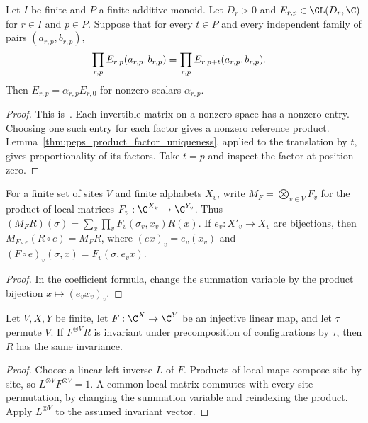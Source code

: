\begin{lemma}%
    \label{thm:peps_directional_product_factors}
    \leanok
    Let $I$ be finite and $P$ a finite additive monoid. Let
    $D_r>0$ and $E_{r,p}\in\GL(D_r,\C)$ for $r\in I$ and $p\in P$.
    Suppose that for every $t\in P$ and every independent family of pairs
    $(a_{r,p},b_{r,p})$,
    \begin{align}
        \prod_{r,p} E_{r,p}(a_{r,p},b_{r,p})
         & =\prod_{r,p} E_{r,p+t}(a_{r,p},b_{r,p}).\notag
    \end{align}
    Then $E_{r,p}=\alpha_{r,p}E_{r,0}$ for nonzero scalars $\alpha_{r,p}$.
\end{lemma}
\begin{proof}\leanok
    This is~\cite[``Proportionality of directional matrix
        factors'']{QICLean2026Blueprint}.
    Each invertible matrix on a nonzero space has a nonzero entry.
    Choosing one such entry for each factor gives a nonzero reference product.
    Lemma~\ref{thm:peps_product_factor_uniqueness}, applied to the
    translation by $t$, gives proportionality of its factors. Take $t=p$
    and inspect the factor at position zero.
\end{proof}

\begin{lemma}%
    \label{thm:peps_physical_product_reindex}
    \leanok
    For a finite set of sites $V$ and finite alphabets $X_v$, write
    $M_F=\bigotimes_{v\in V}F_v$ for the product of local matrices
    $F_v:\C^{X_v}\to\C^{Y_v}$. Thus
    $(M_F R)(\sigma)=\sum_x\prod_vF_v(\sigma_v,x_v)R(x)$.
    If $e_v:X'_v\to X_v$ are bijections, then
    $M_{F\circ e}(R\circ e)=M_F R$, where
    $(e x)_v=e_v(x_v)$ and $(F\circ e)_v(\sigma,x)=F_v(\sigma,e_vx)$.
\end{lemma}
\begin{proof}\leanok
    In the coefficient formula, change the summation variable by the
    product bijection $x\mapsto(e_vx_v)_v$.
\end{proof}

\begin{lemma}%
    \label{thm:peps_common_map_reflects_invariance}
    \leanok
    Let $V,X,Y$ be finite, let $F:\C^X\to\C^Y$ be an injective linear map, and
    let $\tau$ permute $V$. If $F^{\otimes V}R$ is invariant under
    precomposition of configurations by $\tau$, then $R$ has the same
    invariance.
\end{lemma}
\begin{proof}\leanok
    Choose a linear left inverse $L$ of $F$. Products of local maps compose
    site by site, so $L^{\otimes V}F^{\otimes V}=1$.
    A common local matrix commutes with every site permutation, by changing
    the summation variable and reindexing the product. Apply
    $L^{\otimes V}$ to the assumed invariant vector.
\end{proof}

